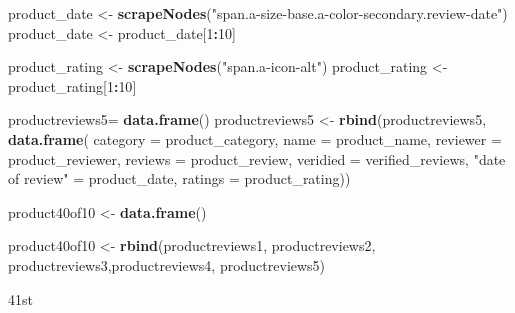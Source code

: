 \documentclass[
]{article}
\newenvironment{Shaded}{\begin{snugshade}}{\end{snugshade}}
\newcommand{\AttributeTok}[1]{\textcolor[rgb]{0.13,0.29,0.53}{#1}}
\newcommand{\DecValTok}[1]{\textcolor[rgb]{0.00,0.00,0.81}{#1}}
\newcommand{\FunctionTok}[1]{\textcolor[rgb]{0.13,0.29,0.53}{\textbf{#1}}}
\newcommand{\NormalTok}[1]{#1}
\newcommand{\OtherTok}[1]{\textcolor[rgb]{0.56,0.35,0.01}{#1}}
\newcommand{\SpecialCharTok}[1]{\textcolor[rgb]{0.81,0.36,0.00}{\textbf{#1}}}
\newcommand{\StringTok}[1]{\textcolor[rgb]{0.31,0.60,0.02}{#1}}
\begin{document}
\begin{Shaded}
\begin{Highlighting}[]
\NormalTok{  product\_date }\OtherTok{\textless{}{-}} \FunctionTok{scrapeNodes}\NormalTok{(}\StringTok{"span.a{-}size{-}base.a{-}color{-}secondary.review{-}date"}\NormalTok{)}
\NormalTok{  product\_date }\OtherTok{\textless{}{-}}\NormalTok{ product\_date[}\DecValTok{1}\SpecialCharTok{:}\DecValTok{10}\NormalTok{]}
  
\NormalTok{  product\_rating }\OtherTok{\textless{}{-}} \FunctionTok{scrapeNodes}\NormalTok{(}\StringTok{"span.a{-}icon{-}alt"}\NormalTok{)}
\NormalTok{  product\_rating }\OtherTok{\textless{}{-}}\NormalTok{ product\_rating[}\DecValTok{1}\SpecialCharTok{:}\DecValTok{10}\NormalTok{]}
  
\NormalTok{  productreviews5}\OtherTok{=} \FunctionTok{data.frame}\NormalTok{()}
\NormalTok{  productreviews5 }\OtherTok{\textless{}{-}} \FunctionTok{rbind}\NormalTok{(productreviews5, }\FunctionTok{data.frame}\NormalTok{(}
                      \AttributeTok{category =}\NormalTok{ product\_category,}
                      \AttributeTok{name =}\NormalTok{ product\_name,}
                      \AttributeTok{reviewer =}\NormalTok{ product\_reviewer,}
                      \AttributeTok{reviews =}\NormalTok{ product\_review,}
                      \AttributeTok{veridied =}\NormalTok{ verified\_reviews,}
                      \StringTok{"date of review"} \OtherTok{=}\NormalTok{ product\_date,}
                      \AttributeTok{ratings =}\NormalTok{ product\_rating))}
  
\NormalTok{  product40of10 }\OtherTok{\textless{}{-}} \FunctionTok{data.frame}\NormalTok{()}
  
\NormalTok{  product40of10 }\OtherTok{\textless{}{-}} \FunctionTok{rbind}\NormalTok{(productreviews1, productreviews2, productreviews3,productreviews4, productreviews5)}
\end{Highlighting}
\end{Shaded}

41st
\end{document}
